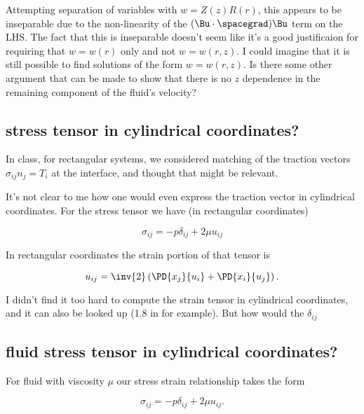 Attempting separation of variables with $w = Z(z) R(r)$, this appears to be inseparable due to the non-linearity of the $(\Bu \cdot \spacegrad) \Bu$ term on the LHS.  The fact that this is inseparable doesn't seem like it's a good justificaion for requiring that $w = w(r)$ only and not $w = w(r,z)$.  I could imagine that it is still possible to find solutions of the form $w = w(r,z)$.  Is there some other argument that can be made to show that there is no $z$ dependence in the remaining component of the fluid's velocity?

\subsection{stress tensor in cylindrical coordinates?}

In class, for rectangular systems, we considered matching of the traction vectors $\sigma_{ij} n_j = T_i$ at the interface, and thought that might be relevant.

It's not clear to me how one would even express the traction vector in cylindrical coordinates.  For the stress tensor we have (in rectangular coordinates)

\begin{equation}\label{eqn:pipeFlowConstPressureGradient:30}
\sigma_{ij} = -p \delta_{ij} + 2 \mu u_{ij}
\end{equation}

In rectangular coordinates the strain portion of that tensor is

\begin{equation}\label{eqn:pipeFlowConstPressureGradient:50}
u_{ij} = \inv{2} \left( 
\PD{x_j}{u_i}
+
\PD{x_i}{u_j}
\right).
\end{equation}

I didn't find it too hard to compute the strain tensor in cylindrical coordinates, and it can also be looked up (1.8 in \cite{landau1960theory} for example).  But how would the $\delta_{ij}$

\subsection{fluid stress tensor in cylindrical coordinates?}


For fluid with viscosity $\mu$ our stress strain relationship takes the form

\begin{equation}\label{eqn:pipeFlowConstPressureGradient:70}
\sigma_{ij} = -p \delta_{ij} + 2 \mu u_{ij}.
\end{equation}

